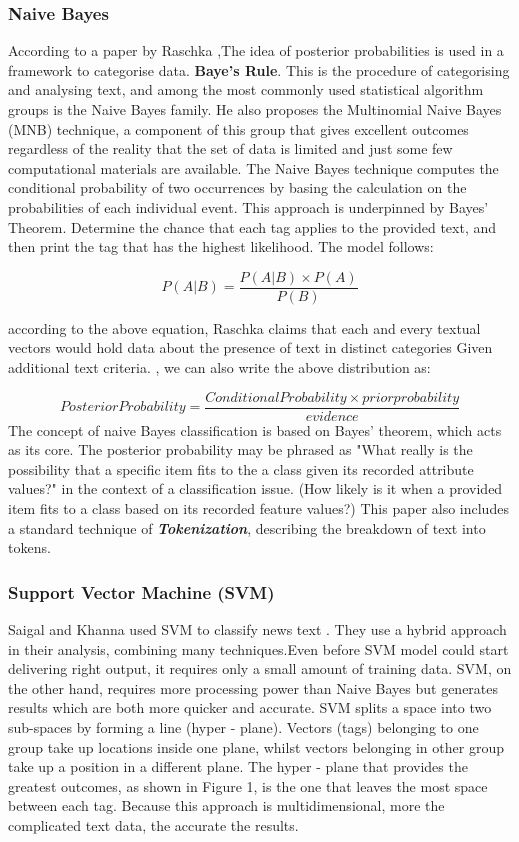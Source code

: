 \documentclass[a4paper]{article}
\begin{document}
\subsubsection {Naive Bayes}
	According to a paper by Raschka \cite{ES6},The idea of posterior probabilities is used in a framework to categorise data. \textbf{Baye's Rule}. This is the procedure of categorising and analysing text, and among the most commonly used statistical algorithm groups is the Naive Bayes family. He also proposes the Multinomial Naive Bayes (MNB) technique, a component of this group that gives excellent outcomes regardless of the reality that the set of data is limited and just some few computational materials are available.
The Naive Bayes technique computes the conditional probability of two occurrences by basing the calculation on the probabilities of each individual event. This approach is underpinned by Bayes' Theorem. Determine the chance that each tag applies to the provided text, and then print the tag that has the highest likelihood. The model follows:

\[P(A|B) = \frac{P(A|B)\times P(A)}{P(B)}\]

according to the above equation, Raschka claims that each and every textual vectors would hold data about the presence of text in distinct categories Given additional text criteria.  \cite{ES6}, we can also write the above distribution as:

$$Posterior Probability = \frac{Conditional Probability \times prior probability}{evidence}$$The concept of naive Bayes classification is based on Bayes' theorem, which acts as its core. The posterior probability may be phrased as "What really is the possibility that a specific item fits to the a class given its recorded attribute values?" in the context of a classification issue. (How likely is it when a provided item fits to a class based on its recorded feature values?) This paper also includes a standard technique of \textbf{\textit{Tokenization}}, describing the breakdown of text into tokens.

\subsubsection{Support Vector Machine (SVM)}
Saigal and Khanna used SVM to classify news text \cite{ES7}. They use a hybrid approach in their analysis, combining many techniques.Even before SVM model could start delivering right output, it requires only a small amount of training data. SVM, on the other hand, requires more processing power than Naive Bayes but generates results which are both more quicker and accurate. SVM splits a space into two sub-spaces by forming a line (hyper - plane). Vectors (tags) belonging to one group take up locations inside one plane, whilst vectors belonging in other group take up a position in a different plane. The hyper - plane that provides the greatest outcomes, as shown in Figure 1, is the one that leaves the most space between each tag. Because this approach is multidimensional, more the complicated text data, the accurate the results.
\end{document}
